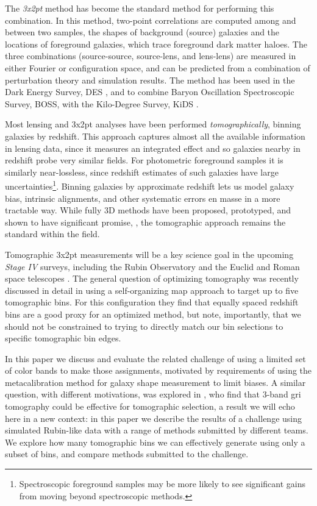 \documentclass[twocolumn,twocolappendix]{aastex63}
\begin{document}
The \emph{3x2pt} method has become the standard method for performing this combination.
In this method, two-point correlations are computed among and between two samples, the shapes of 
background (source) galaxies and the locations of foreground galaxies, which trace foreground
dark matter haloes.  The three combinations (source-source, source-lens, and lens-lens) are
measured in either Fourier or configuration space, and can be predicted from a combination of 
perturbation theory and simulation results.  The method has been used in the Dark Energy Survey, DES
\citep{des-3x2pt}, and to combine Baryon Oscillation Spectroscopic Survey, BOSS, with the Kilo-Degree 
Survey, KiDS \citep{kids-3x2pt}.

Most lensing and 3x2pt analyses have been performed \emph{tomographically}, 
binning galaxies by redshift.
This approach captures almost all the available information in lensing data, since it measures
an integrated effect and so galaxies nearby in redshift probe very similar fields.  For photometric
foreground samples it is similarly near-lossless, since redshift estimates of such galaxies have
large uncertainties\footnote{Spectroscopic foreground samples may be more likely to see significant 
gains from moving beyond spectroscopic methods.}.  Binning galaxies by approximate redshift lets us 
model galaxy bias, intrinsic alignments, and other systematic errors en masse in a more tractable way.
While fully 3D methods have been proposed, prototyped, and shown to have significant promise, 
\citep{heavens,kitching}, the tomographic approach remains the standard within the field.

Tomographic 3x2pt measurements will be a key science goal in the upcoming \emph{Stage IV} surveys,
including the Rubin Observatory \citep{rubin} and the Euclid and Roman space telescopes
\citep{euclid,roman}. The general question of optimizing tomography was recently discussed in detail
in \citet{rainbow} using a self-organizing map approach to target up to five tomographic bins.  For this
configuration they find that equally spaced redshift bins are a good proxy
for an optimized method, but note, importantly, that we should not be constrained to trying to directly
match our bin selections to specific tomographic bin edges.

In this paper we discuss and evaluate the related challenge
of using a limited set of color bands to make those assignments, motivated by requirements of using the
metacalibration method for galaxy shape measurement to limit biases.  
A similar question, with different motivations, was explored in \citet{jain}, who find that 3-band 
gri tomography could be effective for tomographic selection, a result we will echo here in a new context: in this paper we describe the results of a 
challenge using simulated Rubin-like data with a range of methods submitted by different teams.  We explore how many tomographic bins we can effectively generate using only a subset of bins, and compare methods submitted to the challenge.
\end{document}
